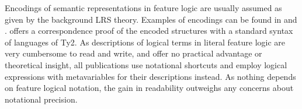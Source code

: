 \documentclass[output=paper]{langsci/langscibook}
\begin{document}
Encodings of semantic representations in feature logic are usually assumed as given by the background LRS theory. Examples of encodings can be found in \citet{Sailer2000a} and \citet{Richter2004a-u}. \citet{Sailer2000a} offers a correspondence proof of the encoded structures with a standard syntax of languages of Ty2. As descriptions of logical terms in literal feature logic are very cumbersome to read and write, and offer no practical advantage or theoretical insight, all publications use notational shortcuts and employ logical expressions with metavariables for their descriptions instead. As nothing depends on feature logical notation, the gain in readability outweighs any concerns about notational precision.

 

{\sloppy
\printbibliography[heading=subbibliography,notkeyword=this] 
}
\end{document}

